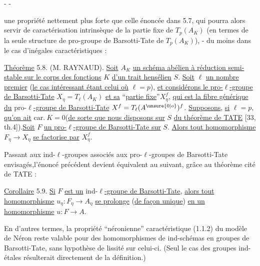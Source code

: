 \begin{center}-  -\end{center}

une propriété nettement plus forte que celle énoncée dans 5.7, qui pourra alors servir de caractérisation intrinsèque de la partie fixe de $T_p(A_K)$ (en termes de la seule structure de pro-groupe de Barsotti-Tate de $T_p(A_K)$), - du moins dans le cas d'inégales caractéristiques :

\uline{Théorème} 5.8. (M. RAYNAUD). \uline{Soit} $A_K$ \uline{un schéma abélien à réduction semi-stable sur le corps des fonctions} $K$ \uline{d'un trait hensélien} $S$. \uline{Soit} $\ell$ \uline{un nombre premier} (\uline{le cas intéressant étant celui où} $\ell=p$), \uline{et considérons le pro-}$\ell$\uline{-groupe de Barsotti-Tate} $X_\eta=T_\ell(A_K)$ \uline{et sa} ``\uline{partie fixe}''$X_\eta^f$, \uline{qui est la fibre générique du} pro-$\ell$\uline{-groupe de Barsotti-Tate} $X^f=T_\ell(A^{\unsure{0|o}})^f$. \uline{Supposons}, \uline{si} $\ell=p$, \uline{qu'on ait} $\mathrm{car.}\ K=0$(\uline{de sorte que nous disposons sur} $S$ \uline{du théorème de TATE} [33, th.4]).\uline{Soit} $F$ \uline{un pro-}$\ell$\uline{-groupe de Barsotti-Tate sur} $S$. \uline{Alors tout homomorphisme} $F_\eta\longrightarrow X_\eta$ \uline{se factorise par} $X_\eta^f$.

Passant aux ind-$\ell$-groupes associés aux pro-$\ell$-groupes de Barsotti-Tate envisagés,l'énoncé précédent devient équivalent au suivant, grâce au théorème cité de TATE :

\uline{Corollaire} 5.9. \uline{Si} $F$ \uline{est un} ind-$\ell$\uline{-groupe de Barsotti-Tate}, \uline{alors tout homomorphisme} $u_\eta:F_\eta\longrightarrow A_\eta$ \uline{se prolonge} (\uline{de façon unique}) \uline{en un homomorphisme} $u:F\longrightarrow A$.

En d'autres termes, la propriété ``néronienne'' caractéristique (1.1.2) du modèle de Néron reste valable pour des homomorphismes de ind-schémas en groupes de Barsotti-Tate, sans hypothèse de lissité sur celui-ci. (Seul le cas des groupes ind-étales résulterait directement de la définition.)

